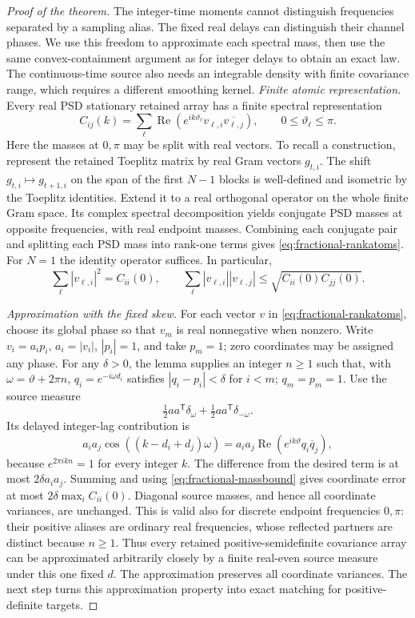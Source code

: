 \begin{proof}[Proof of the theorem]
The integer-time moments cannot distinguish frequencies separated by a sampling alias. The fixed real delays can distinguish their channel phases. We use this freedom to approximate each spectral mass, then use the same convex-containment argument as for integer delays to obtain an exact law. The continuous-time source also needs an integrable density with finite covariance range, which requires a different smoothing kernel.
\emph{Finite atomic representation.}
Every real PSD stationary retained array has a finite spectral
representation
\begin{equation}\label{eq:fractional-rankatoms}
 C_{ij}(k)=\sum_\ell\operatorname{Re}
 (e^{ik\vartheta_\ell}v_{\ell,i}\overline{v_{\ell,j}}),
 \qquad 0\le\vartheta_\ell\le\pi.
\end{equation}
Here the masses at $0,\pi$ may be split with real vectors.
To recall a construction, represent the retained Toeplitz matrix by real
Gram vectors $g_{t,i}$. The shift $g_{t,i}\mapsto g_{t+1,i}$ on the
span of the first $N-1$ blocks is well-defined and isometric by the
Toeplitz identities. Extend it to a real orthogonal operator on the
whole finite Gram space. Its complex spectral decomposition yields
conjugate PSD masses at opposite frequencies, with real endpoint
masses. Combining each conjugate pair and splitting each PSD mass
into rank-one terms gives \eqref{eq:fractional-rankatoms}. For $N=1$ the identity
operator suffices. In particular,
\begin{equation}\label{eq:fractional-massbound}
 \sum_\ell |v_{\ell,i}|^2=C_{ii}(0),\qquad
 \sum_\ell |v_{\ell,i}||v_{\ell,j}|
 \le\sqrt{C_{ii}(0)C_{jj}(0)}.
\end{equation}

\emph{Approximation with the fixed skew.}
For each vector $v$ in \eqref{eq:fractional-rankatoms}, choose its global
phase so that $v_m$ is real nonnegative when nonzero. Write
$v_i=a_ip_i$, $a_i=|v_i|$, $|p_i|=1$, and take $p_m=1$; zero coordinates
may be assigned any phase. For any $\delta>0$, the lemma supplies an
integer $n\ge1$ such that, with $\omega=\vartheta+2\pi n$,
$q_i=e^{-i\omega d_i}$ satisfies $|q_i-p_i|<\delta$ for $i<m$;
$q_m=p_m=1$. Use the source measure
\[
 \tfrac12 aa^{\mathsf T}\delta_\omega+
 \tfrac12 aa^{\mathsf T}\delta_{-\omega}.
\]
Its delayed integer-lag contribution is
\[
 a_i a_j\cos((k-d_i+d_j)\omega)
 =a_i a_j\operatorname{Re}(e^{ik\vartheta}q_i\overline q_j),
\]
because $e^{2\pi i kn}=1$ for every integer $k$.
The difference from the desired term is at most $2\delta a_i a_j$.
Summing and using \eqref{eq:fractional-massbound} gives coordinate error at most
$2\delta\max_i C_{ii}(0)$. Diagonal source masses, and hence all
coordinate variances, are unchanged. This is valid also for discrete
endpoint frequencies $0,\pi$: their positive aliases are ordinary real
frequencies, whose reflected partners are distinct because $n\ge1$.
Thus every retained positive-semidefinite covariance array can be approximated arbitrarily closely by a finite real-even source measure under this one fixed $d$. The approximation preserves all coordinate variances. The next step turns this approximation property into exact matching for positive-definite targets.


\end{proof}
